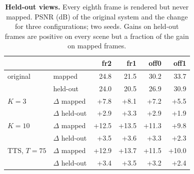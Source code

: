 \begin{table}[t]
\centering
\footnotesize\setlength{\tabcolsep}{3pt}
\begin{tabular}{llrrrr}
\toprule
& & fr2 & fr1 & off0 & off1 \\
\midrule
original & mapped & 24.8 & 21.5 & 30.2 & 33.7 \\
 & held-out & 24.0 & 20.5 & 26.9 & 30.9 \\
\midrule
$K{=}3$ & $\Delta$ mapped & +7.8 & +8.1 & +7.2 & +5.5 \\
 & $\Delta$ held-out & +2.9 & +3.3 & +2.9 & +1.9 \\
$K{=}10$ & $\Delta$ mapped & +12.5 & +13.5 & +11.3 & +9.8 \\
 & $\Delta$ held-out & +3.5 & +3.6 & +3.3 & +2.3 \\
TTS, $T{=}75$ & $\Delta$ mapped & +12.9 & +13.7 & +11.5 & +10.0 \\
 & $\Delta$ held-out & +3.4 & +3.5 & +3.2 & +2.4 \\
\bottomrule
\end{tabular}
\caption{\textbf{Held-out views.} Every eighth frame is rendered but never mapped. PSNR (dB) of the original system and the change for three configurations; two seeds. Gains on held-out frames are positive on every scene but a fraction of the gain on mapped frames.}
\label{tab:engineheld}
\end{table}
